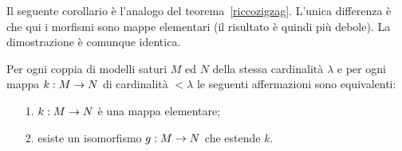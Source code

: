 
Il seguente corollario \`e l'analogo del teorema~\ref{riccozigzag}. L'unica differenza \`e che qui i morfismi sono mappe elementari (il risultato \`e quindi pi\`u debole). La dimostrazione \`e comunque identica.

\begin{theorem}\label{corollariosaturounico}
Per ogni coppia di modelli saturi $M$ ed $N$ della stessa cardinalit\`a $\lambda$ e per ogni mappa $k:M\rightarrow N$ di cardinalit\`a $<\lambda$ le seguenti affermazioni sono equivalenti:
\begin{itemize} 
\item[1.] $k:M\rightarrow N$ \`e una mappa elementare; 
\item[2.] esiste un isomorfismo $g:M\rightarrow N$ che estende $k$.
\end{itemize}
\end{theorem}
\begin{comment}
\begin{proof}
L'implicazione \ssf{2}$\IMP$\ssf{1} \`e ovvia. Per dimostrare \ssf{1}$\IMP$\ssf{2} fissiamo delle enumerazioni di $M$ ed $N$, diciamo $\<a_i\;\;i<\lambda\>$ rispettivamente $\<b_i\;\;i<\lambda\>$. Definiamo per induzione su $i$ una catena di mappe elementari $g_i:M\imp N$ di cardinalit\`a $<\lambda$ e tali che $a_i,b_i\in\dom g_{i+1}$.  L'unione della catena porge l'isomorfismo richiesto.

La catena comincia con $g_0=k$ e agli ordinali limite si estende prendendo l'unione; quindi ora vediamo come estenderla al passo $i+1$. Questo si divide in due mezzi passi. Col primo mezzo passo estendiamo a $g_{i+^1\!/_2}$ in modo da ottenere $a_i\in\dom g_{i+^1\!/_2}$ col secondo estendiamo ulteriormente per ottenere $b_i\in\range g_{i+1}$. Per il lemma~\ref{saturo->ricco} esiste una mappa elementare $h:N\imp M$ che estende $g_i:N\imp M$ e ha come dominio $\dom g_i\cup\{a_i\}$. Definiamo quindi $g_{i+^1\!/_2}=g_i\cup\{\<a_i,ha_i\>\}$. Ora applichiamo lo stesso lemma alla mappa $\big(g_{i+^1\!/_2})^{-1}:N\to M$ per ottenere un'estensione totale $f:N\to M$. Definiamo $g_{i+1}=g_{i+^1\!/_2}\cup\{\<fb_i,b_i\>\}$.
\end{proof}
\end{comment}

